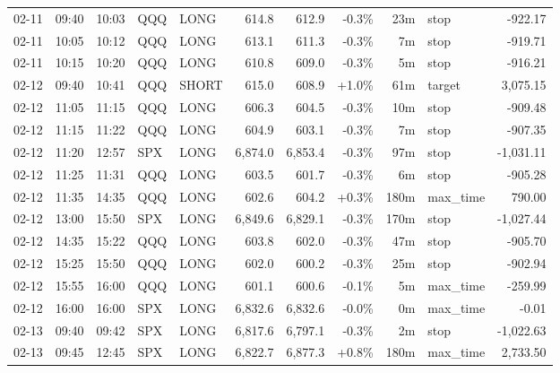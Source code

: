 \documentclass[11pt,a4paper,twoside]{article}
\begin{document}
\begin{center}
\begin{longtable}{>{\color{txtmain}}l l l l l r r r r >{\color{txtmain}}l r}
02-11 & 09:40 & 10:03 & QQQ & LONG & 614.8 & 612.9 & \textcolor{lossred}{-0.3\%} & 23m & stop & \textcolor{lossred}{-922.17} \\
02-11 & 10:05 & 10:12 & QQQ & LONG & 613.1 & 611.3 & \textcolor{lossred}{-0.3\%} & 7m & stop & \textcolor{lossred}{-919.71} \\
02-11 & 10:15 & 10:20 & QQQ & LONG & 610.8 & 609.0 & \textcolor{lossred}{-0.3\%} & 5m & stop & \textcolor{lossred}{-916.21} \\
02-12 & 09:40 & 10:41 & QQQ & SHORT & 615.0 & 608.9 & \textcolor{wingreen}{+1.0\%} & 61m & target & \textcolor{wingreen}{3,075.15} \\
02-12 & 11:05 & 11:15 & QQQ & LONG & 606.3 & 604.5 & \textcolor{lossred}{-0.3\%} & 10m & stop & \textcolor{lossred}{-909.48} \\
02-12 & 11:15 & 11:22 & QQQ & LONG & 604.9 & 603.1 & \textcolor{lossred}{-0.3\%} & 7m & stop & \textcolor{lossred}{-907.35} \\
02-12 & 11:20 & 12:57 & SPX & LONG & 6,874.0 & 6,853.4 & \textcolor{lossred}{-0.3\%} & 97m & stop & \textcolor{lossred}{-1,031.11} \\
02-12 & 11:25 & 11:31 & QQQ & LONG & 603.5 & 601.7 & \textcolor{lossred}{-0.3\%} & 6m & stop & \textcolor{lossred}{-905.28} \\
02-12 & 11:35 & 14:35 & QQQ & LONG & 602.6 & 604.2 & \textcolor{wingreen}{+0.3\%} & 180m & max\_time & \textcolor{wingreen}{790.00} \\
02-12 & 13:00 & 15:50 & SPX & LONG & 6,849.6 & 6,829.1 & \textcolor{lossred}{-0.3\%} & 170m & stop & \textcolor{lossred}{-1,027.44} \\
02-12 & 14:35 & 15:22 & QQQ & LONG & 603.8 & 602.0 & \textcolor{lossred}{-0.3\%} & 47m & stop & \textcolor{lossred}{-905.70} \\
02-12 & 15:25 & 15:50 & QQQ & LONG & 602.0 & 600.2 & \textcolor{lossred}{-0.3\%} & 25m & stop & \textcolor{lossred}{-902.94} \\
02-12 & 15:55 & 16:00 & QQQ & LONG & 601.1 & 600.6 & \textcolor{lossred}{-0.1\%} & 5m & max\_time & \textcolor{lossred}{-259.99} \\
02-12 & 16:00 & 16:00 & SPX & LONG & 6,832.6 & 6,832.6 & \textcolor{lossred}{-0.0\%} & 0m & max\_time & \textcolor{lossred}{-0.01} \\
02-13 & 09:40 & 09:42 & SPX & LONG & 6,817.6 & 6,797.1 & \textcolor{lossred}{-0.3\%} & 2m & stop & \textcolor{lossred}{-1,022.63} \\
02-13 & 09:45 & 12:45 & SPX & LONG & 6,822.7 & 6,877.3 & \textcolor{wingreen}{+0.8\%} & 180m & max\_time & \textcolor{wingreen}{2,733.50} \\

\end{longtable}
\end{center}
\end{document}
